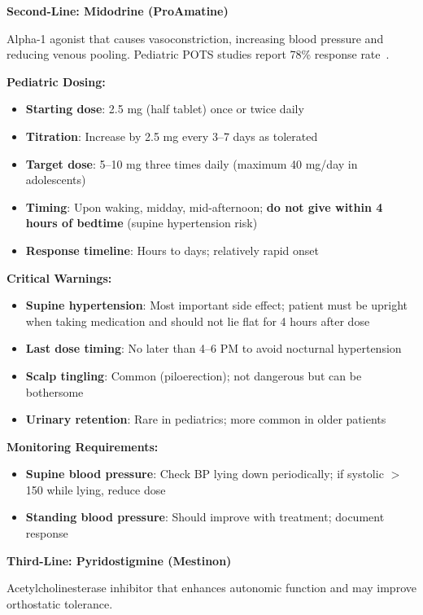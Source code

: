 \begin{protocol}
\textbf{Second-Line: Midodrine (ProAmatine)}

Alpha-1 agonist that causes vasoconstriction, increasing blood pressure and reducing venous pooling. Pediatric POTS studies report 78\% response rate~\cite{Ojha2024pediatricPOTS}.

\textbf{Pediatric Dosing:}
\begin{itemize}
    \item \textbf{Starting dose}: 2.5 mg (half tablet) once or twice daily
    \item \textbf{Titration}: Increase by 2.5 mg every 3--7 days as tolerated
    \item \textbf{Target dose}: 5--10 mg three times daily (maximum 40 mg/day in adolescents)
    \item \textbf{Timing}: Upon waking, midday, mid-afternoon; \textbf{do not give within 4 hours of bedtime} (supine hypertension risk)
    \item \textbf{Response timeline}: Hours to days; relatively rapid onset
\end{itemize}

\textbf{Critical Warnings:}
\begin{itemize}
    \item \textbf{Supine hypertension}: Most important side effect; patient must be upright when taking medication and should not lie flat for 4 hours after dose
    \item \textbf{Last dose timing}: No later than 4--6 PM to avoid nocturnal hypertension
    \item \textbf{Scalp tingling}: Common (piloerection); not dangerous but can be bothersome
    \item \textbf{Urinary retention}: Rare in pediatrics; more common in older patients
\end{itemize}

\textbf{Monitoring Requirements:}
\begin{itemize}
    \item \textbf{Supine blood pressure}: Check BP lying down periodically; if systolic $>$150 while lying, reduce dose
    \item \textbf{Standing blood pressure}: Should improve with treatment; document response
\end{itemize}

\textbf{Third-Line: Pyridostigmine (Mestinon)}

Acetylcholinesterase inhibitor that enhances autonomic function and may improve orthostatic tolerance.


\end{protocol}
